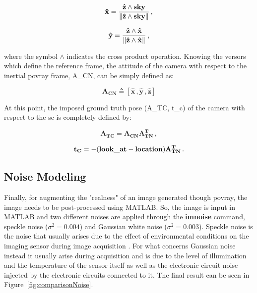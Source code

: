 \begin{equation}
  \mathbf{\hat{x}} = \frac{\mathbf{\hat{z}} \wedge \text{\inlinecode{POV}{sky}}}{\norm{\mathbf{\hat{z}} \wedge \text{\inlinecode{POV}{sky}}}} \,,
\end{equation}

\begin{equation}
  \mathbf{\hat{y}} = \frac{\mathbf{\hat{z}} \wedge \mathbf{\hat{x}}}{\left\lVert\mathbf{\hat{z}} \wedge \mathbf{\hat{x}}\right\rVert} \,,
\end{equation}

where the symbol $\wedge$ indicates the cross product operation. Knowing the versors which define the reference frame, the attitude of the camera with respect to the inertial \acrshort{povray} frame, \gls{A_CN}, can be simply defined as:

\begin{equation}
  \mathbf{{A_{CN}}} \triangleq [\mathbf{\hat{x}} \,, \mathbf{\hat{y}} \,, \mathbf{\hat{z}}]
\end{equation}

At this point, the imposed ground truth pose (\gls{A_TC}, \gls{t_c}) of the camera with respect to the \acrshort{sc} is completely defined by:

\begin{equation}
  \mathbf{{A_{TC}}} = \mathbf{{A_{CN}}} \mathbf{{A^T_{TN}}} \,,
\end{equation}

\begin{equation}
  \mathbf{t_C} = - (\text{\inlinecode{POV}{look_at}} - \text{\inlinecode{POV}{location}}) \mathbf{{A^T_{TN}}} \,.
\end{equation}

\subsection{Noise Modeling}\label{subsection:addingthenoise}
Finally, for augmenting the "realness" of an image generated though \acrshort{povray}, the image needs to be post-processed using MATLAB. So, the image is input in MATLAB and two different noises are applied through the \textbf{imnoise} command, speckle noise ($\sigma^2 = 0.004$) and Gaussian white noise ($\sigma^2 = 0.003$). Speckle noise is the noise that usually arises due to the effect of environmental conditions on the imaging sensor during image acquisition \cite{Maity2015}. For what concerns Gaussian noise instead it usually arise during acquisition and is due to the level of illumination and the temperature of the sensor itself as well as the electronic circuit noise injected by the electronic circuits connected to it. The final result can be seen in Figure~\ref{fig:comparisonNoise}.

